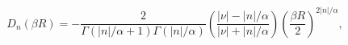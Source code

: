 \begin{equation}
D_n(\beta R)=-\frac2{\Gamma(|n|/\alpha+1)\Gamma(|n|/\alpha)}
\left(\frac{|\nu|-|n|/\alpha}{|\nu|+|n|/\alpha}\right)
\left(\frac{\beta R}{2}\right)^{2|n|/\alpha},
\label{36}
\end{equation} 
